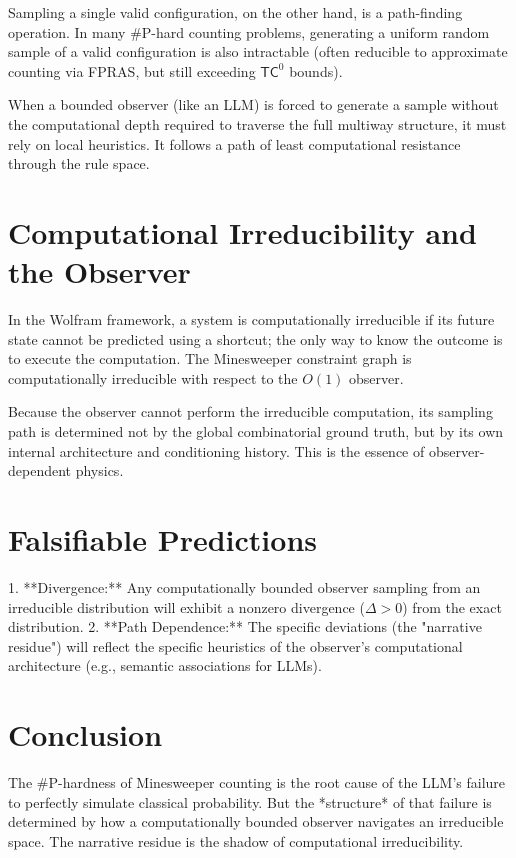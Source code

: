\documentclass[12pt,a4paper]{article}
\begin{document}
Sampling a single valid configuration, on the other hand, is a path-finding operation. In many \#P-hard counting problems, generating a uniform random sample of a valid configuration is also intractable (often reducible to approximate counting via FPRAS, but still exceeding $\mathsf{TC}^0$ bounds).

When a bounded observer (like an LLM) is forced to generate a sample without the computational depth required to traverse the full multiway structure, it must rely on local heuristics. It follows a path of least computational resistance through the rule space.

\section{Computational Irreducibility and the Observer}

In the Wolfram framework, a system is computationally irreducible if its future state cannot be predicted using a shortcut; the only way to know the outcome is to execute the computation. The Minesweeper constraint graph is computationally irreducible with respect to the $O(1)$ observer.

Because the observer cannot perform the irreducible computation, its sampling path is determined not by the global combinatorial ground truth, but by its own internal architecture and conditioning history. This is the essence of observer-dependent physics.

\section{Falsifiable Predictions}

1. **Divergence:** Any computationally bounded observer sampling from an irreducible distribution will exhibit a nonzero divergence ($\Delta > 0$) from the exact distribution.
2. **Path Dependence:** The specific deviations (the "narrative residue") will reflect the specific heuristics of the observer's computational architecture (e.g., semantic associations for LLMs).

\section{Conclusion}

The \#P-hardness of Minesweeper counting is the root cause of the LLM's failure to perfectly simulate classical probability. But the *structure* of that failure is determined by how a computationally bounded observer navigates an irreducible space. The narrative residue is the shadow of computational irreducibility.
\end{document}
